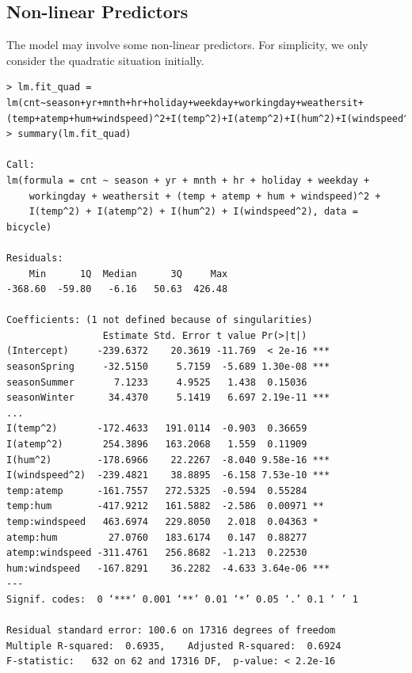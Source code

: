 \subsection{Non-linear Predictors}
\label{sec:non-linear}
The model may involve some non-linear predictors. For simplicity, we only consider the quadratic situation initially.
\begin{lstlisting}[style=rlanguage]
> lm.fit_quad = lm(cnt~season+yr+mnth+hr+holiday+weekday+workingday+weathersit+(temp+atemp+hum+windspeed)^2+I(temp^2)+I(atemp^2)+I(hum^2)+I(windspeed^2),data=bicycle)
> summary(lm.fit_quad)

Call:
lm(formula = cnt ~ season + yr + mnth + hr + holiday + weekday +
    workingday + weathersit + (temp + atemp + hum + windspeed)^2 +
    I(temp^2) + I(atemp^2) + I(hum^2) + I(windspeed^2), data = bicycle)

Residuals:
    Min      1Q  Median      3Q     Max
-368.60  -59.80   -6.16   50.63  426.48

Coefficients: (1 not defined because of singularities)
                 Estimate Std. Error t value Pr(>|t|)
(Intercept)     -239.6372    20.3619 -11.769  < 2e-16 ***
seasonSpring     -32.5150     5.7159  -5.689 1.30e-08 ***
seasonSummer       7.1233     4.9525   1.438  0.15036
seasonWinter      34.4370     5.1419   6.697 2.19e-11 ***
...
I(temp^2)       -172.4633   191.0114  -0.903  0.36659
I(atemp^2)       254.3896   163.2068   1.559  0.11909
I(hum^2)        -178.6966    22.2267  -8.040 9.58e-16 ***
I(windspeed^2)  -239.4821    38.8895  -6.158 7.53e-10 ***
temp:atemp      -161.7557   272.5325  -0.594  0.55284
temp:hum        -417.9212   161.5882  -2.586  0.00971 **
temp:windspeed   463.6974   229.8050   2.018  0.04363 *
atemp:hum         27.0760   183.6174   0.147  0.88277
atemp:windspeed -311.4761   256.8682  -1.213  0.22530
hum:windspeed   -167.8291    36.2282  -4.633 3.64e-06 ***
---
Signif. codes:  0 ‘***’ 0.001 ‘**’ 0.01 ‘*’ 0.05 ‘.’ 0.1 ‘ ’ 1

Residual standard error: 100.6 on 17316 degrees of freedom
Multiple R-squared:  0.6935,	Adjusted R-squared:  0.6924
F-statistic:   632 on 62 and 17316 DF,  p-value: < 2.2e-16
\end{lstlisting}

